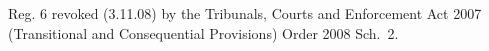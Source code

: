 \documentclass[12pt,a4paper]{article}
\begin{document}
{%
%
%
%
%
%
Reg. 6 revoked (3.11.08) by the Tribunals, Courts and Enforcement Act 2007 (Transitional and Consequential Provisions) Order 2008 Sch.~2.
}
\end{document}
